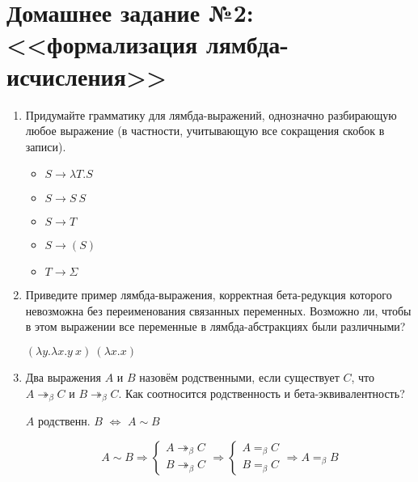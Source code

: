 

\cfoot{}



\section*{Домашнее задание №2: <<формализация лямбда-исчисления>>}

\begin{enumerate}
    \item Придумайте грамматику для лямбда-выражений, однозначно разбирающую любое выражение
          (в частности, учитывающую все сокращения скобок в записи).
          \begin{solution}\itemfix
              \begin{itemize}
                  \item \(S \to \lambda T.S\)
                  \item \(S \to S\ S\)
                  \item \(S \to T\)
                  \item \(S \to (S)\)
                  \item \(T \to \Sigma\)
              \end{itemize}
          \end{solution}
    \item Приведите пример лямбда-выражения, корректная бета-редукция которого невозможна без переименования
          связанных переменных. Возможно ли, чтобы в этом выражении все переменные в лямбда-абстракциях
          были различными?
          \begin{solution}
              \((\lambda y.\lambda x.y\ x)\ (\lambda x.x)\)
          \end{solution}
    \item Два выражения $A$ и $B$ назовём родственными, если существует $C$, что
          $A \twoheadrightarrow_\beta C$ и $B \twoheadrightarrow_\beta C$.
          Как соотносится родственность и бета-эквивалентность?
          \begin{solution}
              \begin{obozn}
                  \(A\) родственн. \(B\) \(\Leftrightarrow\) \(A \sim B\)
              \end{obozn}

              \[A \sim B \Rightarrow \begin{cases}
                      A \twoheadrightarrow_\beta C \\
                      B \twoheadrightarrow_\beta C
                  \end{cases} \Rightarrow \begin{cases}
                      A =_\beta C \\
                      B =_\beta C
                  \end{cases} \Rightarrow A =_\beta B\]


\end{solution}
\end{enumerate}
